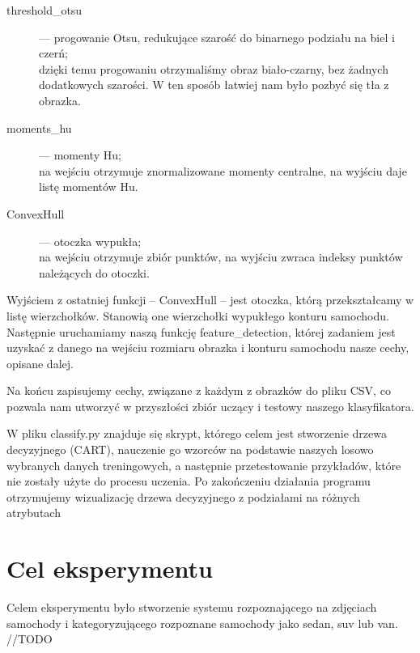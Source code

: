 \documentclass{article}
\begin{document}
\begin{description}
\item[threshold\_otsu] — progowanie Otsu, redukujące szarość do binarnego podziału na biel i czerń;\\
dzięki temu progowaniu otrzymaliśmy obraz biało-czarny, bez żadnych dodatkowych szarości. W ten sposób łatwiej nam było pozbyć się tła z obrazka.
\item[moments\_hu] — momenty Hu;\\
na wejściu otrzymuje znormalizowane momenty centralne, na wyjściu daje listę momentów Hu.
\item[ConvexHull] — otoczka wypukła;\\
na wejściu otrzymuje zbiór punktów, na wyjściu zwraca indeksy punktów należących do otoczki.
\end{description}

Wyjściem z ostatniej funkcji -- ConvexHull -- jest otoczka, którą przekształcamy w listę wierzchołków. Stanowią one wierzchołki wypukłego konturu samochodu. Następnie uruchamiamy naszą funkcję feature\_detection, której zadaniem jest uzyskać z danego na wejściu rozmiaru obrazka i konturu samochodu nasze cechy, opisane dalej.

Na końcu zapisujemy cechy, związane z każdym z obrazków do pliku CSV, co pozwala nam utworzyć w przyszłości zbiór uczący i testowy naszego klasyfikatora.

W pliku classify.py znajduje się skrypt, którego celem jest stworzenie drzewa decyzyjnego (CART), nauczenie go wzorców na podstawie naszych losowo wybranych danych treningowych, a następnie przetestowanie przykładów, które nie zostały użyte do procesu uczenia. Po zakończeniu działania programu otrzymujemy wizualizację drzewa decyzyjnego z podziałami na różnych atrybutach
 
\section{Cel eksperymentu}
Celem eksperymentu było stworzenie systemu rozpoznającego na zdjęciach samochody i kategoryzującego rozpoznane samochody jako sedan, suv lub van. //TODO
\end{document}
